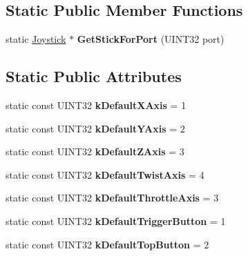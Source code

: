 \subsection*{\-Static \-Public \-Member \-Functions}
\begin{DoxyCompactItemize}
\item 
\hypertarget{classJoystick_a4e134a21fe02f9cb6124c6e0d1391db0}{static \hyperlink{classJoystick}{\-Joystick} $\ast$ {\bfseries \-Get\-Stick\-For\-Port} (\-U\-I\-N\-T32 port)}\label{classJoystick_a4e134a21fe02f9cb6124c6e0d1391db0}

\end{DoxyCompactItemize}
\subsection*{\-Static \-Public \-Attributes}
\begin{DoxyCompactItemize}
\item 
\hypertarget{classJoystick_aca8b52e0227268a44e62000a995e6545}{static const \-U\-I\-N\-T32 {\bfseries k\-Default\-X\-Axis} = 1}\label{classJoystick_aca8b52e0227268a44e62000a995e6545}

\item 
\hypertarget{classJoystick_a1f0904da828bfe3d99f229ad39634984}{static const \-U\-I\-N\-T32 {\bfseries k\-Default\-Y\-Axis} = 2}\label{classJoystick_a1f0904da828bfe3d99f229ad39634984}

\item 
\hypertarget{classJoystick_a1318a7bfeb9134e7c6f024afcbe677c1}{static const \-U\-I\-N\-T32 {\bfseries k\-Default\-Z\-Axis} = 3}\label{classJoystick_a1318a7bfeb9134e7c6f024afcbe677c1}

\item 
\hypertarget{classJoystick_af8c4e12b864e53ee4a5b02c2d7f3999d}{static const \-U\-I\-N\-T32 {\bfseries k\-Default\-Twist\-Axis} = 4}\label{classJoystick_af8c4e12b864e53ee4a5b02c2d7f3999d}

\item 
\hypertarget{classJoystick_a8e8b23407e6daebec33f2302d1674d76}{static const \-U\-I\-N\-T32 {\bfseries k\-Default\-Throttle\-Axis} = 3}\label{classJoystick_a8e8b23407e6daebec33f2302d1674d76}

\item 
\hypertarget{classJoystick_a4693bae107e007140460dd546a2ee135}{static const \-U\-I\-N\-T32 {\bfseries k\-Default\-Trigger\-Button} = 1}\label{classJoystick_a4693bae107e007140460dd546a2ee135}

\item 
\hypertarget{classJoystick_a4357a68c718d794a8b9b5a48bfa8cc07}{static const \-U\-I\-N\-T32 {\bfseries k\-Default\-Top\-Button} = 2}\label{classJoystick_a4357a68c718d794a8b9b5a48bfa8cc07}

\end{DoxyCompactItemize}


